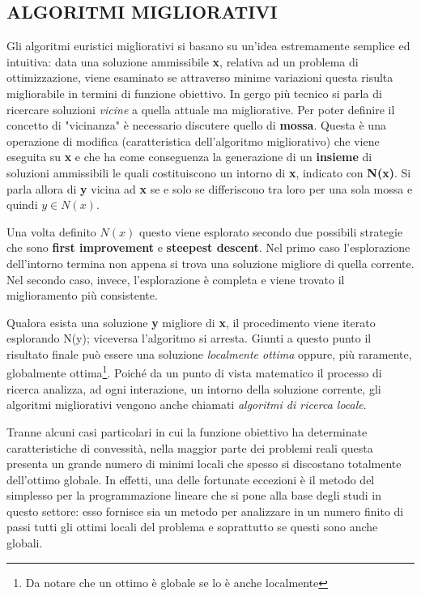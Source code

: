 \documentclass[11pt]{article}
\begin{document}
\subsection*{ALGORITMI MIGLIORATIVI}
\label{sec:MigliorativiS}

Gli algoritmi euristici migliorativi si basano su un'idea estremamente semplice ed intuitiva: data una soluzione ammissibile \textbf{x}, relativa ad un problema di ottimizzazione, viene esaminato se attraverso minime variazioni questa risulta migliorabile in termini di funzione obiettivo.
In gergo più tecnico si parla di ricercare soluzioni \textit{vicine} a quella attuale ma migliorative. Per poter definire il concetto di "vicinanza" è necessario discutere quello di \textbf{mossa}. Questa è una operazione di modifica (caratteristica dell'algoritmo migliorativo) che viene eseguita su \textbf{x} e che ha come conseguenza la generazione di un \textbf{insieme} di soluzioni ammissibili le quali costituiscono un intorno di \textbf{x}, indicato con \textbf{N(x)}. Si parla allora di \textbf{y} vicina ad \textbf{x} se e solo se differiscono tra loro per una sola mossa e quindi $y \in N(x)$.

Una volta definito $N(x)$ questo viene esplorato secondo due possibili strategie che sono \textbf{first improvement} e \textbf{steepest descent}. Nel primo caso l'esplorazione dell'intorno termina non appena si trova una soluzione migliore di quella corrente. Nel secondo caso, invece, l'esplorazione è completa e viene trovato il miglioramento più consistente.

Qualora esista una soluzione \textbf{y} migliore di \textbf{x}, il procedimento viene iterato esplorando N(y); viceversa  l'algoritmo si arresta. Giunti a questo punto il risultato finale può essere una soluzione \textit{localmente ottima} oppure, più raramente, globalmente ottima\footnote{Da notare che un ottimo è globale se lo è anche localmente}. Poiché da un punto di vista matematico il processo di ricerca analizza, ad ogni interazione, un intorno della soluzione corrente, gli algoritmi migliorativi vengono anche chiamati \emph{algoritmi di ricerca locale}.

Tranne alcuni casi particolari in cui la funzione obiettivo ha determinate caratteristiche di convessità, nella maggior parte dei problemi reali questa presenta un grande numero di minimi locali che spesso si discostano totalmente dell'ottimo globale. In effetti, una delle fortunate eccezioni è il metodo del simplesso per la programmazione lineare che si pone alla base degli studi in questo settore: esso fornisce sia un metodo per analizzare in un numero finito di passi tutti gli ottimi locali del problema e soprattutto se questi sono anche globali.
\end{document}
